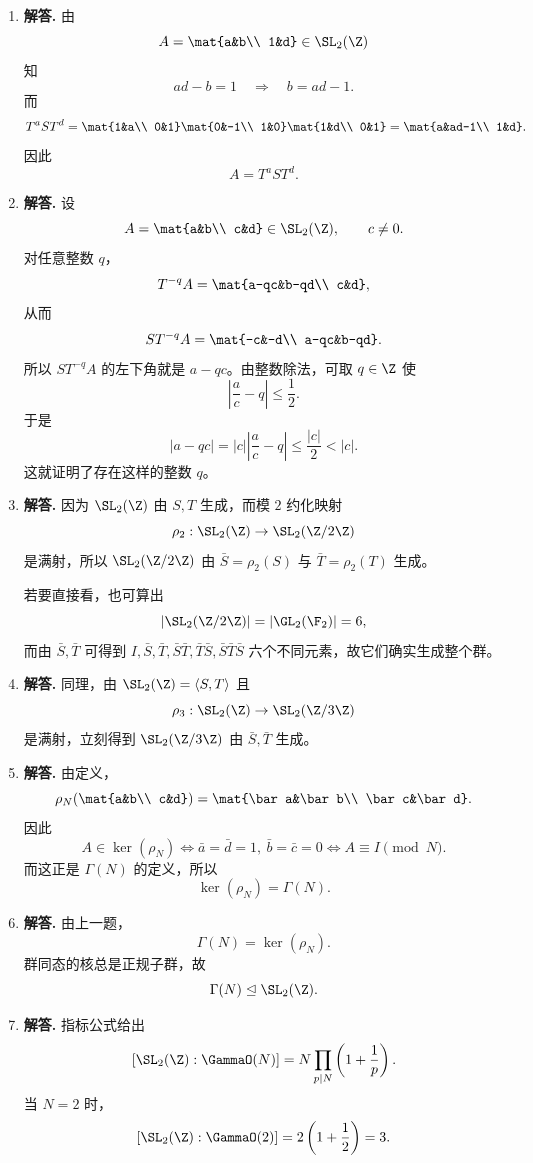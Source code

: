 \begin{enumerate}[label=\textbf{\arabic*.}, leftmargin=*, itemsep=1em]
\item \textbf{解答.} 由
\[
A=\mat{a&b\\ 1&d}\in\SL_2(\Z)
\]
知
\[
ad-b=1\quad\Longrightarrow\quad b=ad-1.
\]
而
\[
T^aST^d
=\mat{1&a\\ 0&1}\mat{0&-1\\ 1&0}\mat{1&d\\ 0&1}
=\mat{a&ad-1\\ 1&d}.
\]
因此
\[
A=T^aST^d.
\]

\item \textbf{解答.} 设
\[
A=\mat{a&b\\ c&d}\in\SL_2(\Z),\qquad c\neq 0.
\]
对任意整数 $q$，
\[
T^{-q}A=\mat{a-qc&b-qd\\ c&d},
\]
从而
\[
ST^{-q}A=\mat{-c&-d\\ a-qc&b-qd}.
\]
所以 $ST^{-q}A$ 的左下角就是 $a-qc$。由整数除法，可取 $q\in\Z$ 使
\[
\left|\frac ac-q\right|\le \frac12.
\]
于是
\[
|a-qc|=|c|\left|\frac ac-q\right|\le \frac{|c|}{2}<|c|.
\]
这就证明了存在这样的整数 $q$。

\item \textbf{解答.} 因为 $\SL_2(\Z)$ 由 $S,T$ 生成，而模 $2$ 约化映射
\[
\rho_2:\SL_2(\Z)\to \SL_2(\Z/2\Z)
\]
是满射，所以 $\SL_2(\Z/2\Z)$ 由 $\bar S=\rho_2(S)$ 与 $\bar T=\rho_2(T)$ 生成。

若要直接看，也可算出
\[
|\SL_2(\Z/2\Z)|=|\GL_2(\F_2)|=6,
\]
而由 $\bar S,\bar T$ 可得到 $I,\bar S,\bar T,\bar S\bar T,\bar T\bar S,\bar S\bar T\bar S$ 六个不同元素，故它们确实生成整个群。

\item \textbf{解答.} 同理，由 $\SL_2(\Z)=\langle S,T\rangle$ 且
\[
\rho_3:\SL_2(\Z)\to \SL_2(\Z/3\Z)
\]
是满射，立刻得到 $\SL_2(\Z/3\Z)$ 由 $\bar S,\bar T$ 生成。

\item \textbf{解答.} 由定义，
\[
\rho_N\!\left(\mat{a&b\\ c&d}\right)=\mat{\bar a&\bar b\\ \bar c&\bar d}.
\]
因此
\[
A\in\ker(\rho_N)
\iff \bar a=\bar d=1,\ \bar b=\bar c=0
\iff A\equiv I\pmod N.
\]
而这正是 $\Gamma(N)$ 的定义，所以
\[
\ker(\rho_N)=\Gamma(N).
\]

\item \textbf{解答.} 由上一题，
\[
\Gamma(N)=\ker(\rho_N).
\]
群同态的核总是正规子群，故
\[
\Gamma(N)\trianglelefteq \SL_2(\Z).
\]

\item \textbf{解答.} 指标公式给出
\[
[\SL_2(\Z):\GammaO(N)]
=N\prod_{p\mid N}\left(1+\frac1p\right).
\]
当 $N=2$ 时，
\[
[\SL_2(\Z):\GammaO(2)]
=2\left(1+\frac12\right)=3.
\]


\end{enumerate}

